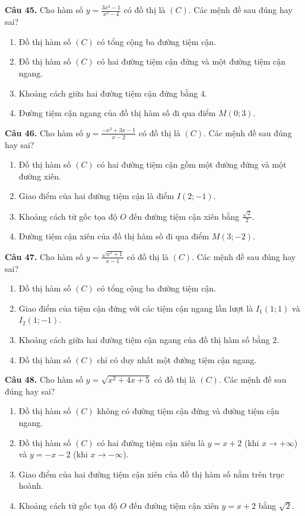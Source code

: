 \documentclass[12pt]{article}
\begin{document}
	\vspace{0.4cm}
	\noindent \textbf{Câu 45.} Cho hàm số $y = \frac{3x^2 - 1}{x^2 - 4}$ có đồ thị là $(C)$. Các mệnh đề sau đúng hay sai?
	\begin{enumerate}[label=\textbf{\alph*)}]
		\item Đồ thị hàm số $(C)$ có tổng cộng ba đường tiệm cận.  
		\item Đồ thị hàm số $(C)$ có hai đường tiệm cận đứng và một đường tiệm cận ngang.  
		\item Khoảng cách giữa hai đường tiệm cận đứng bằng $4$.  
		\item Đường tiệm cận ngang của đồ thị hàm số đi qua điểm $M(0; 3)$.  
	\end{enumerate}
	
	\vspace{0.4cm}
	\noindent \textbf{Câu 46.} Cho hàm số $y = \frac{-x^2 + 3x - 1}{x - 2}$ có đồ thị là $(C)$. Các mệnh đề sau đúng hay sai?
	\begin{enumerate}[label=\textbf{\alph*)}]
		\item Đồ thị hàm số $(C)$ có hai đường tiệm cận gồm một đường đứng và một đường xiên.  
		\item Giao điểm của hai đường tiệm cận là điểm $I(2; -1)$.  
		\item Khoảng cách từ gốc tọa độ $O$ đến đường tiệm cận xiên bằng $\frac{\sqrt{2}}{2}$.  
		\item Đường tiệm cận xiên của đồ thị hàm số đi qua điểm $M(3; -2)$.  
	\end{enumerate}
	
	\vspace{0.4cm}
	\noindent \textbf{Câu 47.} Cho hàm số $y = \frac{\sqrt{x^2 + 1}}{x - 1}$ có đồ thị là $(C)$. Các mệnh đề sau đúng hay sai?
	\begin{enumerate}[label=\textbf{\alph*)}]
		\item Đồ thị hàm số $(C)$ có tổng cộng ba đường tiệm cận.  
		\item Giao điểm của tiệm cận đứng với các tiệm cận ngang lần lượt là $I_1(1; 1)$ và $I_2(1; -1)$.  
		\item Khoảng cách giữa hai đường tiệm cận ngang của đồ thị hàm số bằng $2$.  
		\item Đồ thị hàm số $(C)$ chỉ có duy nhất một đường tiệm cận ngang.  
	\end{enumerate}
	
	\vspace{0.4cm}
	\noindent \textbf{Câu 48.} Cho hàm số $y = \sqrt{x^2 + 4x + 5}$ có đồ thị là $(C)$. Các mệnh đề sau đúng hay sai?
	\begin{enumerate}[label=\textbf{\alph*)}]
		\item Đồ thị hàm số $(C)$ không có đường tiệm cận đứng và đường tiệm cận ngang.  
		\item Đồ thị hàm số $(C)$ có hai đường tiệm cận xiên là $y = x + 2$ (khi $x \to +\infty$) và $y = -x - 2$ (khi $x \to -\infty$).  
		\item Giao điểm của hai đường tiệm cận xiên của đồ thị hàm số nằm trên trục hoành.  
		\item Khoảng cách từ gốc tọa độ $O$ đến đường tiệm cận xiên $y = x + 2$ bằng $\sqrt{2}$.  
	\end{enumerate}
\end{document}
